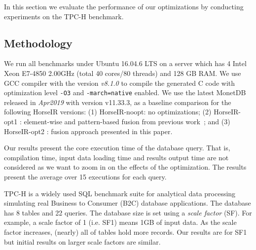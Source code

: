 In this section we evaluate the performance of our optimizations by conducting
experiments on the TPC-H benchmark. 

\subsection{Methodology}

We run all benchmarks under Ubuntu 16.04.6 LTS on a server which has 4 Intel
Xeon E7-4850 2.00GHz (total 40 cores/80 threads) and 128 GB RAM.
We use GCC compiler with the version \textit{v8.1.0} to compile the generated C
code with optimization level \texttt{-O3} and \texttt{-march=native} enabled.
We use the latest MonetDB~\cite{IdreosS2012} released in \textit{Apr2019} with
version v11.33.3, as a baseline comparison for the following HorseIR versions:
(1) HorseIR-noopt: no optimizations;
(2) HorseIR-opt1 : element-wise and pattern-based
fusion from previous work~\OldPaper; and
(3) HorseIR-opt2 : fusion approach presented in this paper.

Our results present the core execution time of the database query. That is,
compilation time, input data loading time and results output time are not considered
as we want to zoom in on the effects of the optimization. The results present
the average over 15 executions for each query.


TPC-H \cite{TPCH2017} is a widely used SQL benchmark suite for analytical data
processing simulating real Business to Consumer (B2C) database applications. The 
database has 8 tables and 22 queries. The database size is set
using a \textit{scale factor} (SF). For example, a scale factor of 1
(i.e. SF1) means 1GB of input data. As the scale factor increases, (nearly) all
of tables hold more records. Our results are for SF1 but initial results
on larger scale factors are similar.


